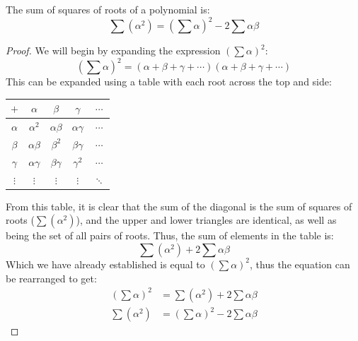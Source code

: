         \begin{theorem}
            The sum of squares of \glspl{root} of a \gls{polynomial} is:
            \begin{equation}
                \sum\left(\alpha^2\right)=\left(\sum\alpha\right)^2-2\sum\alpha\beta
            \end{equation}
        \end{theorem}
        \begin{proof}
            We will begin by expanding the expression $\left(\sum\alpha\right)^2$:
            \begin{equation}
                    \left(\sum\alpha\right)^2=(\alpha+\beta+\gamma+\cdots)(\alpha+\beta+\gamma+\cdots)
            \end{equation}
            This can be expanded using a table with each \gls{root} across the top and side:
            \begin{center}
                \begin{tabular}{c|c c c c}
                    $+$     &$\alpha$  &$\beta$      &$\gamma$      &$\cdots$ \\
                    \hline
                    $\alpha$&$\alpha^2$    &$\alpha\beta$&$\alpha\gamma$&$\cdots$ \\
                    $\beta$ &$\alpha\beta$ &$\beta^2$    &$\beta\gamma$ &$\cdots$ \\
                    $\gamma$&$\alpha\gamma$&$\beta\gamma$&$\gamma^2$    &$\cdots$ \\
                    $\vdots$&$\vdots$      &$\vdots$     &$\vdots$      &$\ddots$
                \end{tabular}
            \end{center}
            From this table, it is clear that the sum of the diagonal is the sum of squares of \glspl{root} ($\sum\left(\alpha^2\right)$), and the upper and lower triangles are identical, as well as being the set of all pairs of \glspl{root}.
            Thus, the sum of elements in the table is:
            \begin{equation}
                \sum\left(\alpha^2\right)+2\sum\alpha\beta
            \end{equation}
            Which we have already established is equal to $\left(\sum\alpha\right)^2$, thus the equation can be rearranged to get:
            \begin{equation}
                \begin{aligned}
                    \left(\sum\alpha\right)^2&=\sum\left(\alpha^2\right)+2\sum\alpha\beta \\
                    \sum\left(\alpha^2\right)&=\left(\sum\alpha\right)^2-2\sum\alpha\beta
                \end{aligned}
            \end{equation}
        \end{proof}

